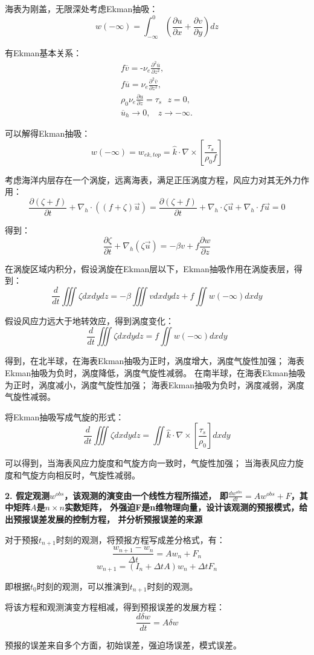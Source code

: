\documentclass{article}
\begin{document}
海表为刚盖，无限深处考虑Ekman抽吸：
$$w(-\infty) = \int_{-\infty}^0(\frac{\partial u}{\partial x} 
+ \frac{\partial v}{\partial y})dz$$

有Ekman基本关系：
\begin{align}
    & f\overline{v}=\text{-}{{\nu }_{e}}\frac{{{\partial }^{2}}\overline{u}}{\partial {{z}^{2}}}, \\ 
   & f\overline{u}={{\nu }_{e}}\frac{{{\partial }^{2}}\overline{v}}{\partial {{z}^{2}}}, \\ 
   & \rho_0\nu_e\frac{\partial u}{\partial z} = \tau_s\ \ \ z=0, \\ 
   & {{\overline{u}}_{h}}\to 0,\ \ \ \ z\to -\infty .\ \ \ \  
\end{align}

可以解得Ekman抽吸：
$$w(-\infty)={{w}_{ek,top}}=\hat{k}\cdot \nabla \times \left[ \frac{{{\tau }_{s}}}{{{\rho }_{0}}f} \right]$$

考虑海洋内层存在一个涡旋，远离海表，满足正压涡度方程，风应力对其无外力作用：
$$\frac{\partial(\zeta+f)}{\partial t} + \nabla_h\cdot((f+\zeta)\vec{u})
 = \frac{\partial(\zeta+f)}{\partial t} + \nabla_h\cdot\zeta\vec{u}
 + \nabla_h\cdot f\vec{u}=0$$

得到：
$$\frac{\partial\zeta}{\partial t} + \nabla_h(\zeta\vec{u})
=-\beta v +f\frac{\partial w}{\partial z}$$

在涡旋区域内积分，假设涡旋在Ekman层以下，Ekman抽吸作用在涡旋表层，得到：
$$\frac{d}{dt}\iiint\zeta dxdydz
=-\beta\iiint v dxdydz + f\iint w(-\infty) dxdy$$

假设风应力远大于地转效应，得到涡度变化：
$$\frac{d}{dt}\iiint\zeta dxdydz
= f\iint  w(-\infty) dxdy$$

得到，在北半球，在海表Ekman抽吸为正时，涡度增大，涡度气旋性加强；
海表Ekman抽吸为负时，涡度降低，涡度气旋性减弱。
在南半球，在海表Ekman抽吸为正时，涡度减小，涡度气旋性加强；
海表Ekman抽吸为负时，涡度减弱，涡度气旋性减弱。

将Ekman抽吸写成气旋的形式：
$$\frac{d}{dt}\iiint\zeta dxdydz
=\iint\hat{k}\cdot \nabla \times \left[ \frac{{{\tau }_{s}}}{{{\rho }_{0}}} \right]dxdy$$

可以得到，当海表风应力旋度和气旋方向一致时，气旋性加强；
当海表风应力旋度和气旋方向相反时，气旋性减弱。

\textbf{2. 假定观测$w^{obs}$，该观测的演变由一个线性方程所描述，
即$\frac{dw^{obs}}{dt} = Aw^{obs} + F$，其中矩阵$A$是$n\times n$实数矩阵，
外强迫F是n维物理向量，设计该观测的预报模式，给出预报误差发展的控制方程，
并分析预报误差的来源}

对于预报$t_{n+1}$时刻的观测，将预报方程写成差分格式，有：
$$\frac{w_{n+1} - w_{n}}{\Delta t} = Aw_{n} + F_n$$
$$w_{n+1} = (I_n+\Delta tA)w_{n} + \Delta tF_n$$

即根据$t_0$时刻的观测，可以推演到$t_{n+1}$时刻的观测。

将该方程和观测演变方程相减，得到预报误差的发展方程：
$$\frac{d\delta w}{dt} = A\delta w$$

预报的误差来自多个方面，初始误差，强迫场误差，模式误差。
\end{document}
